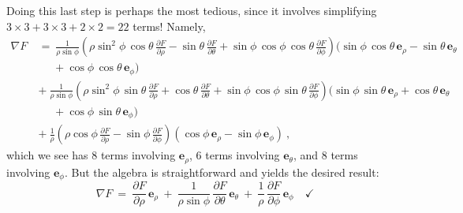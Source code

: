 Doing this last step is perhaps the most tedious, since it involves simplifying $3 \times 3 + 3 \times 3 + 2 \times
2 = 22$ terms! Namely,
\begin{align*}
 \nabla F ~&=~ \frac{1}{\rho\sin\phi}\left( \rho\sin^2\phi\,\cos\theta\,
  \frac{\partial F}{\partial \rho} - \sin\theta\,\frac{\partial F}{\partial \theta} + \sin\phi\,\cos\phi\,\cos\theta\,
  \frac{\partial F}{\partial \phi} \right) (\sin\phi\,\cos\theta\,\textbf{e}_{\rho} - \sin\theta\,\textbf{e}_{\theta}\\
  &\mathrel{\phantom{=}} {} + \cos\phi\,\cos\theta\,\textbf{e}_{\phi})\\
  &+~ \frac{1}{\rho\sin\phi}\left( \rho\sin^2\phi\,\sin\theta\,
  \frac{\partial F}{\partial \rho} + \cos\theta\,\frac{\partial F}{\partial \theta} + \sin\phi\,\cos\phi\,\sin\theta\,
  \frac{\partial F}{\partial \phi} \right) (\sin\phi\,\sin\theta\,\textbf{e}_{\rho} + \cos\theta\,\textbf{e}_{\theta}\\
  &\mathrel{\phantom{=}} {} + \cos\phi\,\sin\theta\,\textbf{e}_{\phi})\\
  &+~ \frac{1}{\rho}\left( \rho\cos\phi\,\frac{\partial F}{\partial \rho} -
  \sin\phi\,\frac{\partial F}{\partial \phi} \right) (\cos\phi\,\textbf{e}_{\rho} - \sin\phi\,\textbf{e}_{\phi}) ~,
\end{align*}
which we see has $8$ terms involving $\textbf{e}_{\rho}$, $6$ terms involving $\textbf{e}_{\theta}$, and
$8$ terms involving $\textbf{e}_{\phi}$. But the algebra is straightforward and yields the desired result:
\begin{displaymath}
 \nabla F ~=~ \frac{\partial F}{\partial \rho}\,\textbf{e}_{\rho} ~+~
  \frac{1}{\rho \sin \phi}\,\frac{\partial F}{\partial \theta}\,\textbf{e}_{\theta} ~+~
  \frac{1}{\rho}\,\frac{\partial F}{\partial \phi}\,\textbf{e}_{\phi} \quad\checkmark
\end{displaymath}

